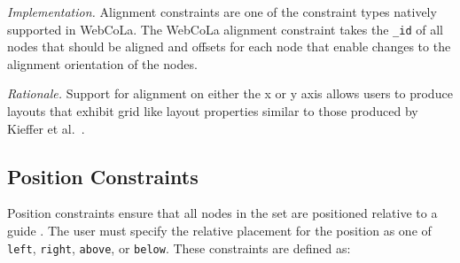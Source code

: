 \emph{Implementation.}
Alignment constraints are one of the constraint types natively supported in
WebCoLa. The WebCoLa alignment constraint takes the \texttt{\_id} of all nodes
that should be aligned and offsets for each node that enable changes to the
alignment orientation of the nodes.

\emph{Rationale.} Support for alignment on either the x or y axis allows
users to produce layouts that exhibit grid like layout properties similar
to those produced by Kieffer et al.\ \cite{kieffer2016hola}.




\subsection{Position Constraints}

Position constraints ensure that all nodes in the set are positioned relative to
a guide . The user must specify the relative
placement for the position as one of \texttt{left}, \texttt{right}, 
\texttt{above}, or \texttt{below}. These constraints are defined as:

